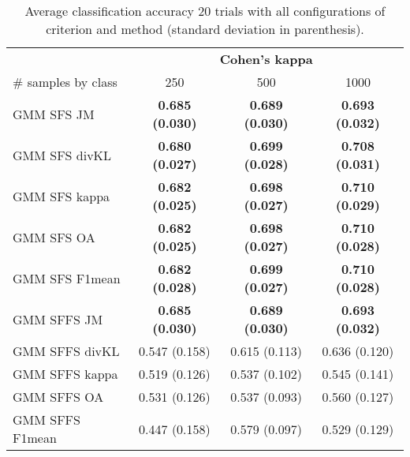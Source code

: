 \documentclass[journal,10pt,onecolumn]{IEEEtran}
\begin{document}
    \begin{table}[H]
        \centering
        \caption{Average classification accuracy 20 trials with all configurations of criterion and method (standard deviation in parenthesis).\label{tab:aisa-otbsimu-all}}
        \begin{tabular}{lccc}\toprule
             & \multicolumn{3}{c}{\bfseries Cohen's kappa} \\ \cmidrule{2-4}
            \# samples by class & 250 & 500 & 1000 \\ \midrule

            GMM SFS JM &      {\bfseries 0.685 (0.030)} & {\bfseries 0.689 (0.030)} & {\bfseries 0.693 (0.032)} \\
            GMM SFS divKL &   {\bfseries 0.680 (0.027)} & {\bfseries 0.699 (0.028)} & {\bfseries 0.708 (0.031)} \\
            GMM SFS kappa &   {\bfseries 0.682 (0.025)} & {\bfseries 0.698 (0.027)} & {\bfseries 0.710 (0.029)} \\
            GMM SFS OA &      {\bfseries 0.682 (0.025)} & {\bfseries 0.698 (0.027)} & {\bfseries 0.710 (0.028)} \\
            GMM SFS F1mean &  {\bfseries 0.682 (0.028)} & {\bfseries 0.699 (0.027)} & {\bfseries 0.710 (0.028)} \\
            GMM SFFS JM &     {\bfseries 0.685 (0.030)} & {\bfseries 0.689 (0.030)} & {\bfseries 0.693 (0.032)} \\
            GMM SFFS divKL &  0.547 (0.158) & 0.615 (0.113) & 0.636 (0.120) \\
            GMM SFFS kappa &  0.519 (0.126) & 0.537 (0.102) & 0.545 (0.141) \\
            GMM SFFS OA &     0.531 (0.126) & 0.537 (0.093) & 0.560 (0.127) \\
            GMM SFFS F1mean & 0.447 (0.158) & 0.579 (0.097) & 0.529 (0.129) \\
            \bottomrule
        \end{tabular}
    \end{table}
\end{document}
